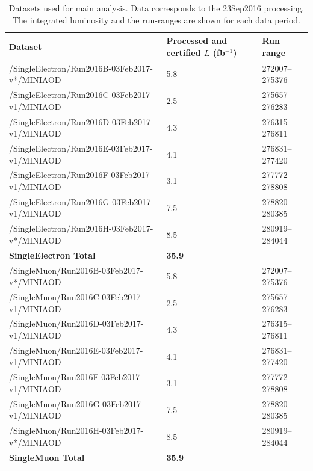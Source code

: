 \begin{table}[htp]
\centering
\caption{
Datasets used for main analysis. Data corresponds to the 23Sep2016 processing.
The integrated luminosity and the run-ranges are shown for each data period.
}
\label{tab:datasets}
\begin{tabular}{lll}
\hline
Dataset                                & Processed and certified $L$ (fb$^{-1}$)  & Run range \\
\hline
{\small /SingleElectron/Run2016B-03Feb2017-v*/MINIAOD}       & {\small 5.8} & 272007--275376\\
{\small /SingleElectron/Run2016C-03Feb2017-v1/MINIAOD}       & {\small 2.5} & 275657--276283\\
{\small /SingleElectron/Run2016D-03Feb2017-v1/MINIAOD}       & {\small 4.3} & 276315--276811\\
{\small /SingleElectron/Run2016E-03Feb2017-v1/MINIAOD}       & {\small 4.1} &276831--277420\\
{\small /SingleElectron/Run2016F-03Feb2017-v1/MINIAOD}       & {\small 3.1} &277772--278808\\
{\small /SingleElectron/Run2016G-03Feb2017-v1/MINIAOD}       & {\small 7.5} &278820--280385\\
{\small /SingleElectron/Run2016H-03Feb2017-v*/MINIAOD}       & {\small 8.5} &280919--284044\\
\hline
{\bf SingleElectron Total}   & {\bf 35.9} & \\
\hline
{\small /SingleMuon/Run2016B-03Feb2017-v*/MINIAOD}       & {\small 5.8} & 272007--275376\\
{\small /SingleMuon/Run2016C-03Feb2017-v1/MINIAOD}       & {\small 2.5} & 275657--276283\\
{\small /SingleMuon/Run2016D-03Feb2017-v1/MINIAOD}       & {\small 4.3} & 276315--276811\\
{\small /SingleMuon/Run2016E-03Feb2017-v1/MINIAOD}       & {\small 4.1} &276831--277420\\
{\small /SingleMuon/Run2016F-03Feb2017-v1/MINIAOD}       & {\small 3.1} &277772--278808\\
{\small /SingleMuon/Run2016G-03Feb2017-v1/MINIAOD}       & {\small 7.5} &278820--280385\\
{\small /SingleMuon/Run2016H-03Feb2017-v*/MINIAOD}       & {\small 8.5} &280919--284044\\
\hline
{\bf SingleMuon Total}   & {\bf 35.9} & \\
\hline
\end{tabular}
\end{table}

